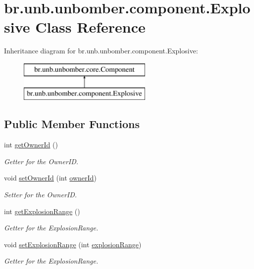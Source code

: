 \hypertarget{classbr_1_1unb_1_1unbomber_1_1component_1_1_explosive}{\section{br.\+unb.\+unbomber.\+component.\+Explosive Class Reference}
\label{classbr_1_1unb_1_1unbomber_1_1component_1_1_explosive}
}
Inheritance diagram for br.\+unb.\+unbomber.\+component.\+Explosive\+:\begin{figure}[H]
\begin{center}
\leavevmode
\includegraphics[height=2.000000cm]{classbr_1_1unb_1_1unbomber_1_1component_1_1_explosive}
\end{center}
\end{figure}
\subsection*{Public Member Functions}
\begin{DoxyCompactItemize}
\item 
int \hyperlink{classbr_1_1unb_1_1unbomber_1_1component_1_1_explosive_acfea77d668213ea51e2522bdc8b20fe9}{get\+Owner\+Id} ()
\begin{DoxyCompactList}\small\item\em Getter for the Owner\+I\+D. \end{DoxyCompactList}\item 
void \hyperlink{classbr_1_1unb_1_1unbomber_1_1component_1_1_explosive_a4ee210744e5b0167cb7bdf70273acfae}{set\+Owner\+Id} (int \hyperlink{classbr_1_1unb_1_1unbomber_1_1component_1_1_explosive_aaae830a9fd8d589da39728a3c2a8b5d6}{owner\+Id})
\begin{DoxyCompactList}\small\item\em Setter for the Owner\+I\+D. \end{DoxyCompactList}\item 
int \hyperlink{classbr_1_1unb_1_1unbomber_1_1component_1_1_explosive_a042555324760dec350edcec93d6afcd1}{get\+Explosion\+Range} ()
\begin{DoxyCompactList}\small\item\em Getter for the Explosion\+Range. \end{DoxyCompactList}\item 
void \hyperlink{classbr_1_1unb_1_1unbomber_1_1component_1_1_explosive_a166fb3a5858907ca396cfe3cf0763ed2}{set\+Explosion\+Range} (int \hyperlink{classbr_1_1unb_1_1unbomber_1_1component_1_1_explosive_a79e3f764ed1603e84456f09be6356f2c}{explosion\+Range})
\begin{DoxyCompactList}\small\item\em Getter for the Explosion\+Range. \end{DoxyCompactList}\end{DoxyCompactItemize}
